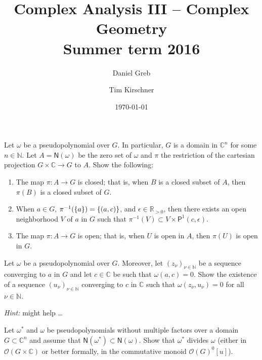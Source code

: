 \documentclass[a4paper]{amsart}
\newcommand{\N}{\mathbb{N}}
\newcommand{\C}{\mathbb{C}}
\newcommand{\R}{\mathbb{R}}
\newcommand{\Polydisk}[3]{\mathsf{P}^{#1}(#2,#3)}
\newcommand{\Zero}[1]{\mathsf{N}(#1)}
\renewcommand{\O}{\mathcal{O}}
\theoremstyle{remark}
\numberwithin{equation}{question}
\DeclarePairedDelimiter\set{\{}{\}}
\begin{document}
\title[Complex Analysis III]{Complex Analysis III -- Complex Geometry\\ Summer term 2016}
\author{Daniel Greb}
\author{Tim Kirschner}
\date{\today}
\maketitle

\begin{question}[subtitle={Closedness and openness of the Weierstraß map}]
\label{qu:weierstrass map}
Let $\omega$ be a pseudopolynomial over $G$. In particular, $G$ is a domain in $\C^n$ for some $n \in \N$. Let $A = \Zero\omega$ be the zero set of $\omega$ and $\pi$ the restriction of the cartesian projection $G \times \C \to G$ to $A$. Show the following:
\begin{enumerate}
\item \label{it:weierstrass map-a} The map $\pi \colon A \to G$ is closed; that is, when $B$ is a closed subset of $A$, then $\pi(B)$ is a closed subset of $G$.
\item \label{it:weierstrass map-b} When $a \in G$, $\pi^{-1}(\set a) = \set{(a,c)}$, and $\epsilon \in \R_{>0}$, then there exists an open neighborhood $V$ of $a$ in $G$ such that $\pi^{-1}(V) \subset V \times \Polydisk1c\epsilon$.
\item \label{it:weierstrass map-c} The map $\pi \colon A \to G$ is open; that is, when $U$ is open in $A$, then $\pi(U)$ is open in $G$.
\end{enumerate}
\end{question}

\begin{question}[subtitle={Continuity of roots}]
\label{qu:continuity of roots}
Let $\omega$ be a pseudopolynomial over $G$. Moreover, let $(z_\nu)_{\nu \in \N}$ be a sequence converging to $a$ in $G$ and let $c \in \C$ be such that $\omega(a,c) = 0$. Show the existence of a sequence $(u_\nu)_{\nu \in \N}$ converging to $c$ in $\C$ such that $\omega(z_\nu,u_\nu) = 0$ for all $\nu \in \N$.

\emph{Hint:}  might help \ldots
\end{question}

\begin{question}[subtitle={Factorization from the geometric picture}]
\label{qu:factorization}
Let $\omega^*$ and $\omega$ be pseudopolynomials without multiple factors over a domain $G \subset \C^n$ and assume that $\Zero{\omega^*} \subset \Zero\omega$. Show that $\omega^*$ divides $\omega$ (either in $\O(G \times \C)$ or better formally, in the commutative monoid $\O(G)^0[u]$).
\end{question}
\end{document}
